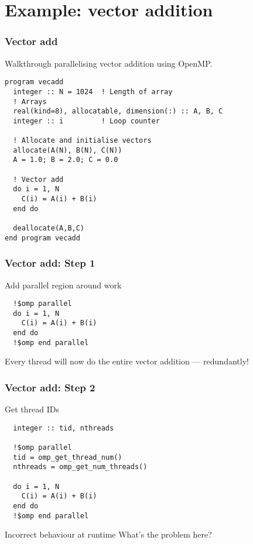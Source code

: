 \documentclass{beamer}
\begin{document}
\section{Example: vector addition}
\begin{frame}[fragile]
\frametitle{Vector add}
Walkthrough parallelising vector addition using OpenMP.

\begin{verbatim}
program vecadd
  integer :: N = 1024  ! Length of array
  ! Arrays
  real(kind=8), allocatable, dimension(:) :: A, B, C
  integer :: i         ! Loop counter

  ! Allocate and initialise vectors
  allocate(A(N), B(N), C(N))
  A = 1.0; B = 2.0; C = 0.0

  ! Vector add
  do i = 1, N
    C(i) = A(i) + B(i)
  end do

  deallocate(A,B,C)
end program vecadd
\end{verbatim}
\end{frame}

\begin{frame}[fragile]
\frametitle{Vector add: Step 1}
Add parallel region around work
\begin{verbatim}
  !$omp parallel
  do i = 1, N
    C(i) = A(i) + B(i)
  end do
  !$omp end parallel
\end{verbatim}
Every thread will now do the entire vector addition --- redundantly!
\end{frame}

\begin{frame}[fragile]
\frametitle{Vector add: Step 2}
Get thread IDs
\begin{verbatim}
  integer :: tid, nthreads

  !$omp parallel
  tid = omp_get_thread_num()
  nthreads = omp_get_num_threads()

  do i = 1, N
    C(i) = A(i) + B(i)
  end do
  !$omp end parallel
\end{verbatim}

\pause
\begin{alertblock}{Incorrect behaviour at runtime}
What's the problem here?
\end{alertblock}
\end{frame}
\end{document}
